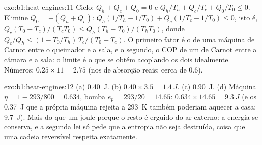 \begin{solution}{exo:b1:heat-engines:11}
Ciclo: $Q_h + Q_c + Q_0 = 0$ e $Q_h/T_h + Q_c/T_c + Q_0/T_0 \leq 0$.
Elimine $Q_0 = -(Q_h + Q_c)$: $Q_h(1/T_h - 1/T_0) + Q_c(1/T_c - 1/T_0) \leq 0$,
isto é, $Q_c(T_0 - T_c)/(T_cT_0) \leq Q_h(T_h - T_0)/(T_hT_0)$, donde
$Q_c/Q_h \leq (1 - T_0/T_h)\,T_c/(T_0 - T_c)$. O primeiro fator é o
 de uma máquina de Carnot entre o queimador e a sala, e o segundo, o
COP de um  de Carnot entre a câmara e a sala: o limite é o que
se obtém acoplando os dois idealmente. Números: $0.25 \times 11 = 2.75$
(nos  de absorção reais: cerca de $0.6$).
\end{solution}

\begin{solution}{exo:b1:heat-engines:12}
(a) \qty{0.40}{J}. (b) $0.40 \times 3.5 = \qty{1.4}{J}$. (c) \qty{0.90}{J}.
(d) Máquina $\eta = 1 - 293/800 = 0.634$, bomba $e_p = 293/20 = 14.65$:
$0.634 \times 14.65 = \qty{9.3}{J}$ (e os \qty{0.37}{J} que a própria máquina
rejeita a \qty{293}{K} também poderiam aquecer a casa: \qty{9.7}{J}). Mais do que
um joule porque o resto é erguido do ar externo: a energia se
conserva, e a segunda lei só pede que a entropia não seja destruída,
coisa que uma cadeia reversível respeita exatamente.
\end{solution}

